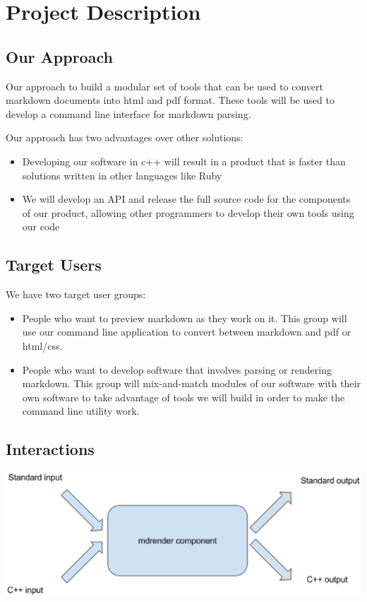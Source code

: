 \section{Project Description}

\subsection{Our Approach}
Our approach to build a modular set of tools that can be used to convert markdown documents into html and pdf format. These tools will be used to develop a command line interface for markdown parsing.

Our approach has two advantages over other solutions:
\begin{itemize}
	\item Developing our software in c++ will result in a product that is faster than solutions written in other languages like Ruby
	\item We will develop an API and release the full source code for the components of our product, allowing other programmers to develop their own tools using our code
\end{itemize}

\subsection{Target Users}

We have two target user groups:
\begin{itemize}
  \item People who want to preview markdown as they work on it. This group will use our command line application to convert between markdown and pdf or html/css.
  \item People who want to develop software that involves parsing or rendering markdown. This group will mix-and-match modules of our software with their own software to take advantage of tools we will build in order to make the command line utility work.
\end{itemize}

\subsection{Interactions}

\includegraphics[width=500pt]{images/mdrender_interactions.eps}

